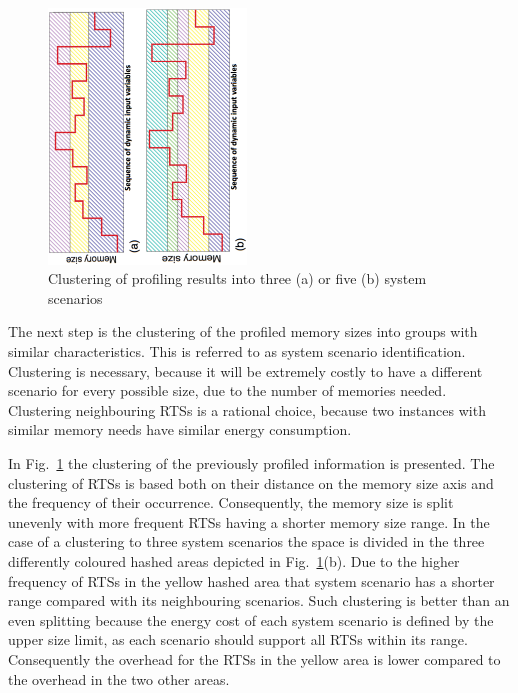 \documentclass[a4paper,conference]{IEEEtran}
\begin{document}
\begin{figure}[!t]
\centering
\includegraphics[angle=270, width=0.47\textwidth]{Images/1Dclustering.ps}
\caption{Clustering of profiling results into three (a) or five (b) system scenarios}
\label{fig:clustering}
\end{figure}

The next step is the clustering of the profiled memory sizes into groups with similar characteristics. This is referred to as system scenario identification. Clustering is necessary, because it will be extremely costly to have a different scenario for every possible size, due to the number of memories needed. Clustering neighbouring RTSs is a rational choice, because two instances with similar memory needs have similar energy consumption. 

In Fig.~\ref{fig:clustering} the clustering of the previously profiled information is presented. The clustering of RTSs is based both on their distance on the memory size axis and the frequency of their occurrence. Consequently, the memory size is split unevenly with more frequent RTSs having a shorter memory size range. In the case of a clustering to three system scenarios the space is divided in the three differently coloured hashed areas depicted in Fig.~\ref{fig:clustering}(b). Due to the higher frequency of RTSs in the yellow hashed area that system scenario has a shorter range compared with its neighbouring scenarios. Such clustering is better than an even splitting because the energy cost of each system scenario is defined by the upper size limit, as each scenario should support all RTSs within its range. Consequently the overhead for the RTSs in the yellow area is lower compared to the overhead in the two other areas.
\end{document}
